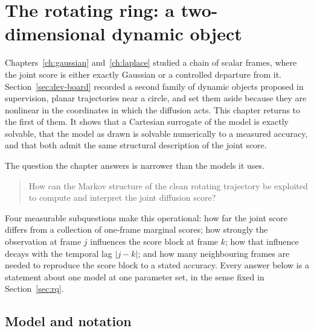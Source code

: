 %

\chapter{The rotating ring: a two-dimensional dynamic object}
\label{ch:ring}

Chapters~\ref{ch:gaussian} and~\ref{ch:laplace} studied a chain of scalar
frames, where the joint score is either exactly Gaussian or a controlled
departure from it. Section~\ref{sec:dev-board} recorded a second family of
dynamic objects proposed in supervision, planar trajectories near a circle,
and set them aside because they are nonlinear in the coordinates in which the
diffusion acts. This chapter returns to the first of them. It shows that a
Cartesian surrogate of the model is exactly solvable, that the model as drawn
is solvable numerically to a measured accuracy, and that both admit the same
structural description of the joint score.

The question the chapter answers is narrower than the models it uses.

\begin{quote}
How can the Markov structure of the clean rotating trajectory be exploited to
compute and interpret the joint diffusion score?
\end{quote}

Four measurable subquestions make this operational: how far the joint score
differs from a collection of one-frame marginal scores; how strongly the
observation at frame $j$ influences the score block at frame $k$; how that
influence decays with the temporal lag $|j-k|$; and how many neighbouring
frames are needed to reproduce the score block to a stated accuracy. Every
answer below is a statement about one model at one parameter set, in the sense
fixed in Section~\ref{sec:rq}.

\section{Model and notation}\label{sec:ring-model}

